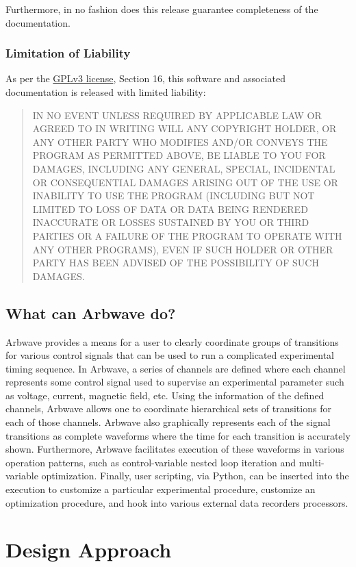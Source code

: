 Furthermore, in no fashion does this release guarantee completeness of the
documentation.

\subsubsection{Limitation of Liability}
As per the \href{https://www.gnu.org/licenses/gpl-3.0.en.html}{GPLv3 license},
Section 16, this software and associated documentation is released with limited
liability\cite{gplv3}:
\begin{quote}
IN NO EVENT UNLESS REQUIRED BY APPLICABLE LAW OR AGREED TO IN WRITING WILL ANY
COPYRIGHT HOLDER, OR ANY OTHER PARTY WHO MODIFIES AND/OR CONVEYS THE PROGRAM AS
PERMITTED ABOVE, BE LIABLE TO YOU FOR DAMAGES, INCLUDING ANY GENERAL, SPECIAL,
INCIDENTAL OR CONSEQUENTIAL DAMAGES ARISING OUT OF THE USE OR INABILITY TO USE
THE PROGRAM (INCLUDING BUT NOT LIMITED TO LOSS OF DATA OR DATA BEING RENDERED
INACCURATE OR LOSSES SUSTAINED BY YOU OR THIRD PARTIES OR A FAILURE OF THE
PROGRAM TO OPERATE WITH ANY OTHER PROGRAMS), EVEN IF SUCH HOLDER OR OTHER PARTY
HAS BEEN ADVISED OF THE POSSIBILITY OF SUCH DAMAGES.
\end{quote}


\subsection{What can Arbwave do?}
Arbwave provides a means for a user to clearly coordinate groups of transitions
for various control signals that can be used to run a complicated experimental
timing sequence.  In Arbwave, a series of channels are defined where each
channel represents some control signal used to supervise an experimental
parameter such as voltage, current, magnetic field, etc.  Using the
information of the defined channels, Arbwave allows one to coordinate
hierarchical sets of transitions for each of those channels.  Arbwave also
graphically represents each of the signal transitions as complete waveforms
where the time for each transition is accurately shown.  Furthermore, Arbwave
facilitates execution of these waveforms in various operation patterns, such
as control-variable nested loop iteration and multi-variable optimization.
Finally, user scripting, via Python, can be inserted into the execution to
customize a particular experimental procedure, customize an optimization
procedure, and hook into various external data recorders processors.


\section{Design Approach}

